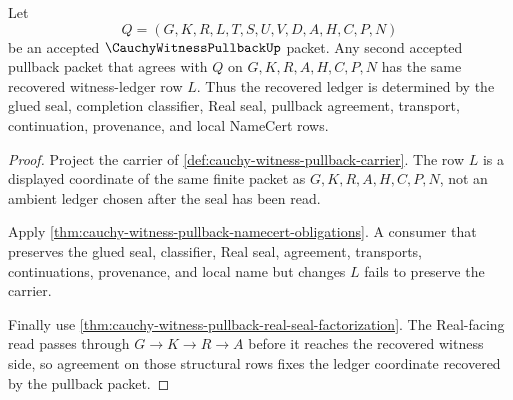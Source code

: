 \begin{theorem}
\label{thm:cauchy-witness-pullback-recovered-ledger-determinacy}
Let
$$
Q=(G,K,R,L,T,S,U,V,D,A,H,C,P,N)
$$
be an accepted $\CauchyWitnessPullbackUp$ packet. Any second accepted pullback packet that agrees with $Q$ on $G,K,R,A,H,C,P,N$ has the same recovered witness-ledger row $L$. Thus the recovered ledger is determined by the glued seal, completion classifier, Real seal, pullback agreement, transport, continuation, provenance, and local NameCert rows.
\end{theorem}
\begin{proof}
Project the carrier of \autoref{def:cauchy-witness-pullback-carrier}. The row $L$ is a displayed coordinate of the same finite packet as $G,K,R,A,H,C,P,N$, not an ambient ledger chosen after the seal has been read.

Apply \autoref{thm:cauchy-witness-pullback-namecert-obligations}. A consumer that preserves the glued seal, classifier, Real seal, agreement, transports, continuations, provenance, and local name but changes $L$ fails to preserve the carrier.

Finally use \autoref{thm:cauchy-witness-pullback-real-seal-factorization}. The Real-facing read passes through $G \to K \to R \to A$ before it reaches the recovered witness side, so agreement on those structural rows fixes the ledger coordinate recovered by the pullback packet.
\end{proof}

